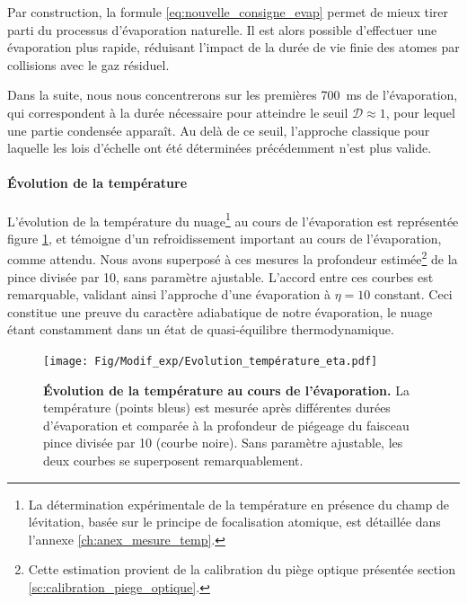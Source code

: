 Par construction, la formule \ref{eq:nouvelle_consigne_evap} permet de mieux tirer parti du processus d'évaporation naturelle. Il est alors possible d'effectuer une évaporation plus rapide, réduisant l'impact de la durée de vie finie des atomes par collisions avec le gaz résiduel. 

Dans la suite, nous nous concentrerons sur les premières \SI{700}{\milli\second} de l'évaporation, qui correspondent à la durée nécessaire pour atteindre le seuil $\mathcal{D}\approx 1$, pour lequel une partie condensée apparaît. Au delà de ce seuil, l'approche classique pour laquelle les lois d'échelle ont été déterminées précédemment n'est plus valide.%
 



\paragraph*{Évolution de la température}

L'évolution de la température du nuage\footnote{La détermination expérimentale de la température en présence du champ de lévitation, basée sur le principe de focalisation atomique, est détaillée dans l'annexe \ref{ch:anex_mesure_temp}.} au cours de l'évaporation est représentée figure \ref{fig:eta_constant}, et témoigne d'un refroidissement important au cours de l'évaporation, comme attendu. Nous avons superposé à ces mesures la profondeur estimée\footnote{Cette estimation provient de la calibration du piège optique présentée section \ref{sc:calibration_piege_optique}.} de la pince divisée par 10, sans paramètre ajustable. L'accord entre ces courbes est remarquable, validant ainsi l'approche d'une évaporation à $\eta=10$ constant. Ceci constitue une preuve du caractère adiabatique de notre évaporation, le nuage étant constamment dans un état de quasi-équilibre thermodynamique.

\begin{figure}
\centering
\texttt{[image: Fig/Modif\_exp/Evolution\_température\_eta.pdf]}
\caption{\textbf{Évolution de la température au cours de l'évaporation.} La température (points bleus) est mesurée après différentes durées d'évaporation et comparée à la profondeur de piégeage du faisceau pince divisée par 10 (courbe noire). Sans paramètre ajustable, les deux courbes se superposent remarquablement.}
\label{fig:eta_constant}
\end{figure}







